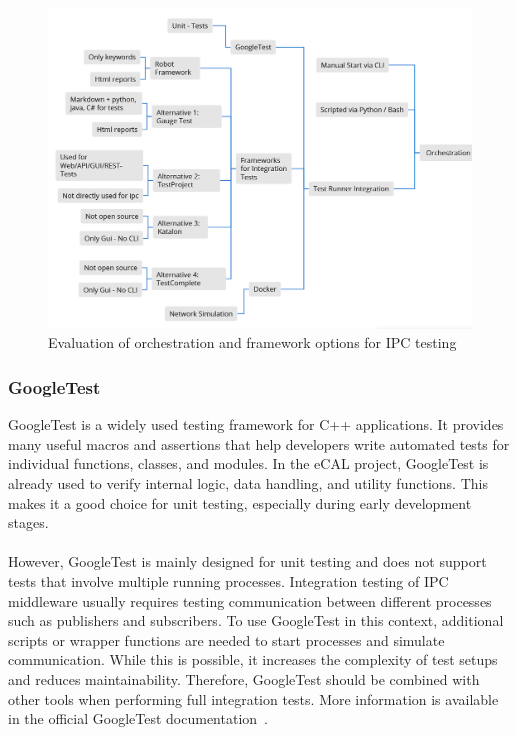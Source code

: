 \begin{figure}[H]
	\centering
	\includegraphics[width=\textwidth]{Images/mm_04_orchestration.png}
	\caption{Evaluation of orchestration and framework options for IPC testing}
	\label{fig:mm_orchestration}
\end{figure}

\subsubsection*{GoogleTest}

GoogleTest is a widely used testing framework for C++ applications. It provides many useful macros and assertions that help developers write automated tests for individual functions, classes, and modules. In the eCAL project, GoogleTest is already used to verify internal logic, data handling, and utility functions. This makes it a good choice for unit testing, especially during early development stages.
\\
\\
However, GoogleTest is mainly designed for unit testing and does not support tests that involve multiple running processes. Integration testing of IPC middleware usually requires testing communication between different processes such as publishers and subscribers. To use GoogleTest in this context, additional scripts or wrapper functions are needed to start processes and simulate communication. While this is possible, it increases the complexity of test setups and reduces maintainability. Therefore, GoogleTest should be combined with other tools when performing full integration tests. More information is available in the official GoogleTest documentation~\cite{GoogleTestDocs}.

